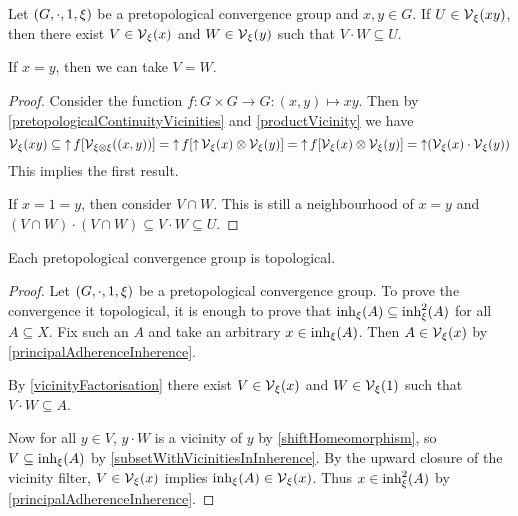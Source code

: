 \begin{lemma} \label{vicinityFactorisation}
Let $\left( G,\cdot, 1, \xi \right)$ be a pretopological convergence group and $x,y\in G$. If $U\in \operatorname{\mathcal{V}}_\xi(xy)$, then there exist $V\in \operatorname{\mathcal{V}}_\xi(x)$ and $W\in \operatorname{\mathcal{V}}_\xi(y)$ such that $V\cdot W\subseteq U$.

If $x=y$, then we can take $V = W$.
\end{lemma}
\begin{proof}
Consider the function $f: G\times G \to G: (x,y)\mapsto xy$. Then by \ref{pretopologicalContinuityVicinities} and \ref{productVicinity} we have
\[ \operatorname{\mathcal{V}}_\xi(xy) \subseteq \operatorname{\uparrow} f[\operatorname{\mathcal{V}}_{\xi\otimes\xi}((x,y))] = \operatorname{\uparrow} f[\operatorname{\uparrow} \operatorname{\mathcal{V}}_\xi(x)\otimes \operatorname{\mathcal{V}}_\xi(y)] = \operatorname{\uparrow} f[\operatorname{\mathcal{V}}_\xi(x)\otimes \operatorname{\mathcal{V}}_\xi(y)] = \operatorname{\uparrow} (\operatorname{\mathcal{V}}_\xi(x)\cdot \operatorname{\mathcal{V}}_\xi(y)) \]
This implies the first result.

If $x=1=y$, then consider $V\cap W$. This is still a neighbourhood of $x=y$ and $(V\cap W)\cdot(V\cap W) \subseteq V\cdot W \subseteq U$.
\end{proof}

\begin{proposition} \label{pretopologicalGroupConvergence}
Each pretopological convergence group is topological.
\end{proposition}
\begin{proof}
Let $\left( G,\cdot, 1, \xi \right)$ be a pretopological convergence group. To prove the convergence it topological, it is enough to prove that $\operatorname{inh}_\xi(A) \subseteq \operatorname{inh}^2_\xi(A)$ for all $A\subseteq X$. Fix such an $A$ and take an arbitrary $x\in \operatorname{inh}_\xi(A)$. Then $A\in \operatorname{\mathcal{V}}_\xi(x)$ by \ref{principalAdherenceInherence}.

By \ref{vicinityFactorisation} there exist $V\in \operatorname{\mathcal{V}}_\xi(x)$ and $W\in\operatorname{\mathcal{V}}_\xi(1)$ such that $V\cdot W \subseteq A$.

Now for all $y\in V$, $y\cdot W$ is a vicinity of $y$ by \ref{shiftHomeomorphism}, so $V \subseteq \operatorname{inh}_\xi(A)$ by \ref{subsetWithVicinitiesInInherence}. By the upward closure of the vicinity filter, $V\in \operatorname{\mathcal{V}}_\xi(x)$ implies $\operatorname{inh}_\xi(A) \in \operatorname{\mathcal{V}}_\xi(x)$. Thus $x\in \operatorname{inh}_\xi^2(A)$ by \ref{principalAdherenceInherence}.
\end{proof}

